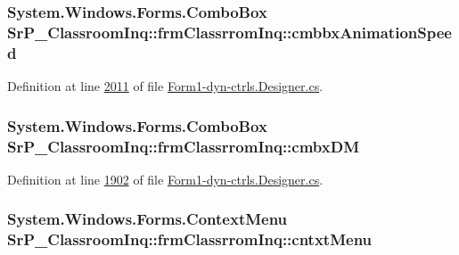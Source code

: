 \hypertarget{class_sr_p___classroom_inq_1_1frm_classrrom_inq_a23b040624768af2dd1a9417f5ba031d3}{
\subsubsection[{cmbbx\-Animation\-Speed}]{\setlength{\rightskip}{0pt plus 5cm}\-System.\-Windows.\-Forms.\-Combo\-Box {\bf \-Sr\-P\-\_\-\-Classroom\-Inq\-::frm\-Classrrom\-Inq\-::cmbbx\-Animation\-Speed}}}
\label{class_sr_p___classroom_inq_1_1frm_classrrom_inq_a23b040624768af2dd1a9417f5ba031d3}


\-Definition at line \hyperlink{_form1-dyn-ctrls_8_designer_8cs_source_l02011}{2011} of file \hyperlink{_form1-dyn-ctrls_8_designer_8cs_source}{\-Form1-\/dyn-\/ctrls.\-Designer.\-cs}.

\hypertarget{class_sr_p___classroom_inq_1_1frm_classrrom_inq_a3d1c3cd1ef0f02e6e927a4fd741672e5}{
\subsubsection[{cmbx\-D\-M}]{\setlength{\rightskip}{0pt plus 5cm}\-System.\-Windows.\-Forms.\-Combo\-Box {\bf \-Sr\-P\-\_\-\-Classroom\-Inq\-::frm\-Classrrom\-Inq\-::cmbx\-D\-M}}}
\label{class_sr_p___classroom_inq_1_1frm_classrrom_inq_a3d1c3cd1ef0f02e6e927a4fd741672e5}


\-Definition at line \hyperlink{_form1-dyn-ctrls_8_designer_8cs_source_l01902}{1902} of file \hyperlink{_form1-dyn-ctrls_8_designer_8cs_source}{\-Form1-\/dyn-\/ctrls.\-Designer.\-cs}.

\hypertarget{class_sr_p___classroom_inq_1_1frm_classrrom_inq_a7fb167457515aba637054c47a301188e}{
\subsubsection[{cntxt\-Menu}]{\setlength{\rightskip}{0pt plus 5cm}\-System.\-Windows.\-Forms.\-Context\-Menu {\bf \-Sr\-P\-\_\-\-Classroom\-Inq\-::frm\-Classrrom\-Inq\-::cntxt\-Menu}}}
\label{class_sr_p___classroom_inq_1_1frm_classrrom_inq_a7fb167457515aba637054c47a301188e}


